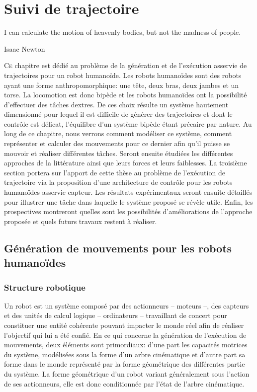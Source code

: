 \chapter{Suivi de trajectoire}
\label{chap:suivi}


\epigraph{\foreignlanguage{USenglish}{I can calculate the motion of
    heavenly bodies, but not the madness of people.}}{Isaac Newton}
\clearpage

\lettrine[lines=2, lraise=0.1, nindent=0em, slope=-.5em]%
{C}{e} chapitre est dédié au problème de la génération et de
l'exécution asservie de trajectoires pour un robot humanoïde. Les
robots humanoïdes sont des robots ayant une forme anthropomorphique:
une tête, deux bras, deux jambes et un torse. La locomotion est donc
bipède et les robots humanoïdes ont la possibilité d'effectuer des
tâches dextres. De ces choix résulte un système hautement dimensionné
pour lequel il est difficile de générer des trajectoires et dont le
contrôle est délicat, l'équilibre d'un système bipède étant précaire
par nature. Au long de ce chapitre, nous verrons comment modéliser ce
système, comment représenter et calculer des mouvements pour ce
dernier afin qu'il puisse se mouvoir et réaliser différentes
tâches. Seront ensuite étudiées les différentes approches de la
littérature ainsi que leurs forces et leurs faiblesses. La troisième
section portera sur l'apport de cette thèse au problème de l'exécution
de trajectoire via la proposition d'une architecture de contrôle pour
les robots humanoïdes asservie capteur. Les résultats expérimentaux
seront ensuite détaillés pour illustrer une tâche dans laquelle le
système proposé se révèle utile. Enfin, les prospectives montreront
quelles sont les possibilités d'améliorations de l'approche proposée
et quels futurs travaux restent à réaliser.

\section{Génération de mouvements pour les robots humanoïdes}
\subsection{Structure robotique}

Un robot est un système composé par des actionneurs -- moteurs --, des
capteurs et des unités de calcul logique -- ordinateurs -- travaillant
de concert pour constituer une entité cohérente pouvant impacter le
monde réel afin de réaliser l'objectif qui lui a été confié. En ce qui
concerne la génération de l'exécution de mouvements, deux éléments
sont primordiaux: d'une part les capacités motrices du système,
modélisées sous la forme d'un arbre cinématique et d'autre part sa
forme dans le monde représenté par la forme géométrique des
différentes partie du système. La forme géométrique d'un robot variant
généralement sous l'action de ses actionneurs, elle est donc
conditionnée par l'état de l'arbre cinématique.

